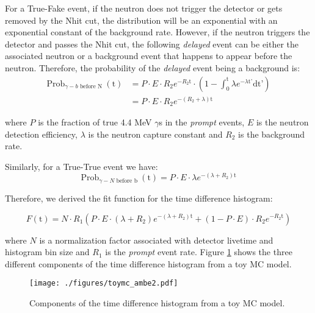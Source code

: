 \documentclass[a4paper]{jpconf}
\begin{document}
For a True-Fake event, if the neutron does not trigger the detector or gets removed by the Nhit cut, the distribution will be an exponential with an exponential constant of the background rate. However, if the neutron triggers the detector and passes the Nhit cut, the following \textit{delayed} event can be either the associated neutron or a background event that happens to appear before the neutron. Therefore, the probability of the \textit{delayed} event being a background is:
\begin{equation}
\begin{aligned}
\textrm{Prob}_{\gamma - b\textrm{ before N }}(\textrm{t}) & = P \cdot E \cdot R_{2} e^{-R_{2}\textrm{t}} \cdot (1- \int_0^{\textrm{t}} \lambda e^{-\lambda \textrm{t'}}\textrm{dt'}) \\
& = P \cdot E \cdot R_{2} e^{-(R_{2}+\lambda)\textrm{t}}
\end{aligned}
\end{equation}

where $P$ is the fraction of true 4.4 MeV $\gamma$s in the \textit{prompt} events, $E$ is the neutron detection efficiency, $\lambda$ is the neutron capture constant and $R_2$ is the background rate.

Similarly, for a True-True event we have:
\begin{equation}
\textrm{Prob}_{\gamma - N\textrm{ before b }}(\textrm{t}) = P \cdot E \cdot \lambda e^{-(\lambda+R_{2})\textrm{t}}
\end{equation}

Therefore, we derived the fit function for the time difference histogram:

\begin{equation}
F(\textrm{t}) = N \cdot R_{1} (P \cdot E \cdot (\lambda+R_{2}) e^{-(\lambda+R_{2}) \textrm{t}} + (1-P \cdot E) \cdot R_{2} e^{-R_{2} \textrm{t}})
\end{equation}

where $N$ is a normalization factor associated with detector livetime and histogram bin size and $R_{1}$ is the \textit{prompt} event rate. Figure \ref{fig:2} shows the three different components of the time difference histogram from a toy MC model.

\begin{figure}[h]
\begin{center}
\texttt{[image: ./figures/toymc\_ambe2.pdf]}
\end{center}
\caption{\label{fig:2}Components of the time difference histogram from a toy MC model.}
\end{figure}
\end{document}
